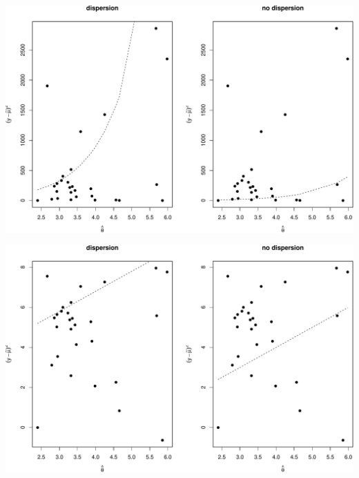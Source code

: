 \documentclass[
  ignorenonframetext,
]{beamer}
\begin{document}
\begin{frame}{}
\protect\hypertarget{section-22}{}
\includegraphics{week5_p2_files/figure-beamer/unnamed-chunk-27-1.pdf}
\end{frame}

\begin{frame}{}
\protect\hypertarget{section-23}{}
\includegraphics{week5_p2_files/figure-beamer/unnamed-chunk-28-1.pdf}
\end{frame}
\end{document}
